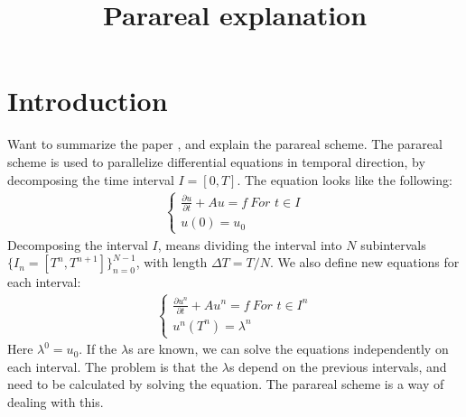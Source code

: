 \documentclass[11pt,a4paper]{article}
\title{Parareal explanation}
\begin{document}
\maketitle
\section{Introduction}
Want to summarize the paper \cite{lions2001resolution}, and explain the parareal scheme. The parareal scheme is used to parallelize differential equations in temporal direction, by decomposing the time interval $I=[0,T]$. The equation looks like the following:
\begin{align}
\left\{
     \begin{array}{lr}
		\frac{\partial u}{\partial t} + Au = f \ 				\textit{For $t \in I$} \\
		u(0)=u_0
	\end{array}
   \right.			
\end{align} 
Decomposing the interval $I$, means dividing the interval into $N$ subintervals $\{I_n = [T^{n},T^{n+1}]\}_{n=0}^{N-1}$, with length $\Delta T = T/N$. We also define new equations for each interval:
\begin{align}
\left\{
     \begin{array}{lr}
		\frac{\partial u^n}{\partial t} + Au^n = f \ 				\textit{For $t \in I^n$} \\
		u^n(T^n)=\lambda^n
	\end{array}
\right.	
\end{align}
Here $\lambda^0=u_0$. If the $\lambda$s are known, we can solve the equations independently on each interval. The problem is that the $\lambda$s depend on the previous intervals, and need to be calculated by solving the equation. The parareal scheme is a way of dealing with this.
\end{document}
